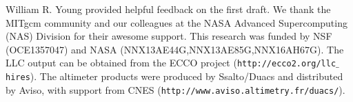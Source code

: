 \documentclass[grl]{agutex2015}
\begin{document}
\begin{article}
%
%




%

\begin{acknowledgments}
 William R. Young provided helpful feedback on the first draft. We thank the MITgcm community and our colleagues at the NASA Advanced
Supercomputing (NAS) Division for their awesome support.
This research was funded by NSF (OCE1357047) and NASA (NNX13AE44G,NNX13AE85G,NNX16AH67G).
The LLC output can be obtained from the ECCO project (\texttt{http://ecco2.org/llc$\_$hires}). The altimeter products were produced by Ssalto/Duacs
and distributed by Aviso, with support from CNES (\texttt{http://www.aviso.altimetry.fr/duacs/}).
\end{acknowledgments}


\end{article}
\end{document}
